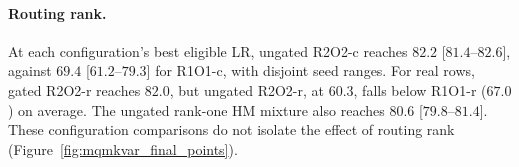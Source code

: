\paragraph{Routing rank.}
At each configuration’s best eligible LR, ungated R2O2-c reaches $82.2$ [$81.4$--$82.6$], against $69.4$ [$61.2$--$79.3$] for R1O1-c, with disjoint seed ranges. For real rows, gated R2O2-r reaches $82.0$, but ungated R2O2-r, at $60.3$, falls below R1O1-r ($67.0$) on average.
The ungated rank-one HM mixture also reaches $80.6$ [$79.8$--$81.4$]. These configuration comparisons do not isolate the effect of routing rank (Figure~\ref{fig:mqmkvar_final_points}).
